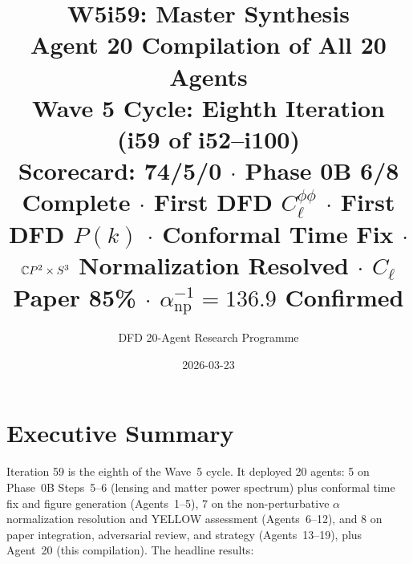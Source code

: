 \documentclass[11pt,a4paper]{article}
\title{\Huge W5i59: Master Synthesis\\[12pt]
\Large Agent 20 Compilation of All 20 Agents\\[6pt]
\large Wave 5 Cycle: Eighth Iteration (i59 of i52--i100)\\[6pt]
\normalsize Scorecard: 74/5/0 $\cdot$ Phase 0B 6/8 Complete $\cdot$ First DFD $C_\ell^{\phi\phi}$ $\cdot$ First DFD $P(k)$ $\cdot$ Conformal Time Fix $\cdot$ $\mathbb{C}P^2 \times S^3$ Normalization Resolved $\cdot$ $C_\ell$ Paper 85\% $\cdot$ $\alpha^{-1}_{\mathrm{np}} = 136.9$ Confirmed}
\author{DFD 20-Agent Research Programme}
\date{2026-03-23}
\begin{document}
\maketitle


\section{Executive Summary}

Iteration 59 is the eighth of the Wave~5 cycle. It deployed 20 agents: 5 on Phase~0B Steps~5--6 (lensing and matter power spectrum) plus conformal time fix and figure generation (Agents~1--5), 7 on the non-perturbative $\alpha$ normalization resolution and YELLOW assessment (Agents~6--12), and 8 on paper integration, adversarial review, and strategy (Agents~13--19), plus Agent~20 (this compilation). The headline results:
\end{document}
